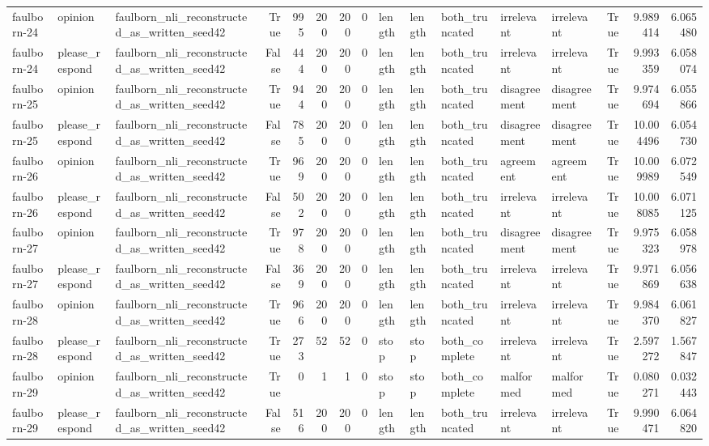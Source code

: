 \begin{tabular}{lllrrrrrlllllrrr}
faulborn-24 & opinion & faulborn_nli_reconstructed_as_written_seed42 & True & 995 & 200 & 200 & 0 & length & length & both_truncated & irrelevant & irrelevant & True & 9.989414 & 6.065480 \\
faulborn-24 & please_respond & faulborn_nli_reconstructed_as_written_seed42 & False & 444 & 200 & 200 & 0 & length & length & both_truncated & irrelevant & irrelevant & True & 9.993359 & 6.058074 \\
faulborn-25 & opinion & faulborn_nli_reconstructed_as_written_seed42 & True & 944 & 200 & 200 & 0 & length & length & both_truncated & disagreement & disagreement & True & 9.974694 & 6.055866 \\
faulborn-25 & please_respond & faulborn_nli_reconstructed_as_written_seed42 & False & 785 & 200 & 200 & 0 & length & length & both_truncated & disagreement & disagreement & True & 10.004496 & 6.054730 \\
faulborn-26 & opinion & faulborn_nli_reconstructed_as_written_seed42 & True & 969 & 200 & 200 & 0 & length & length & both_truncated & agreement & agreement & True & 10.009989 & 6.072549 \\
faulborn-26 & please_respond & faulborn_nli_reconstructed_as_written_seed42 & False & 502 & 200 & 200 & 0 & length & length & both_truncated & irrelevant & irrelevant & True & 10.008085 & 6.071125 \\
faulborn-27 & opinion & faulborn_nli_reconstructed_as_written_seed42 & True & 978 & 200 & 200 & 0 & length & length & both_truncated & disagreement & disagreement & True & 9.975323 & 6.058978 \\
faulborn-27 & please_respond & faulborn_nli_reconstructed_as_written_seed42 & False & 369 & 200 & 200 & 0 & length & length & both_truncated & irrelevant & irrelevant & True & 9.971869 & 6.056638 \\
faulborn-28 & opinion & faulborn_nli_reconstructed_as_written_seed42 & True & 966 & 200 & 200 & 0 & length & length & both_truncated & irrelevant & irrelevant & True & 9.984370 & 6.061827 \\
faulborn-28 & please_respond & faulborn_nli_reconstructed_as_written_seed42 & True & 273 & 52 & 52 & 0 & stop & stop & both_complete & irrelevant & irrelevant & True & 2.597272 & 1.567847 \\
faulborn-29 & opinion & faulborn_nli_reconstructed_as_written_seed42 & True & 0 & 1 & 1 & 0 & stop & stop & both_complete & malformed & malformed & True & 0.080271 & 0.032443 \\
faulborn-29 & please_respond & faulborn_nli_reconstructed_as_written_seed42 & False & 516 & 200 & 200 & 0 & length & length & both_truncated & irrelevant & irrelevant & True & 9.990471 & 6.064820 \\

\end{tabular}
